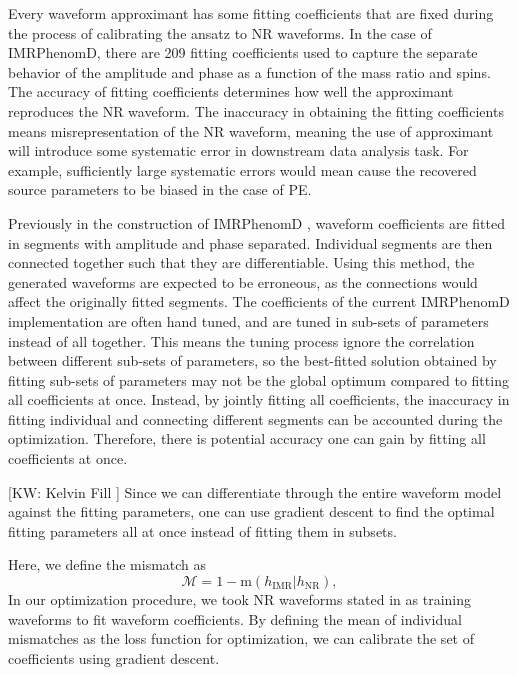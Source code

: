\documentclass[twocolumn]{aastex631}
\newcommand{\kw}[1]{{\color{rb4}[KW: #1 ]}}
\begin{document}
Every waveform approximant has some fitting coefficients that are fixed during
the process of calibrating the ansatz to NR waveforms. In the case of
IMRPhenomD, there are 209 fitting coefficients used to capture the separate
behavior of the amplitude and phase as a function of the mass ratio and spins.
The accuracy of fitting coefficients determines how well the approximant
reproduces the NR waveform. The inaccuracy in obtaining the fitting coefficients
means misrepresentation of the NR waveform, meaning the use of approximant will
introduce some systematic error in downstream data analysis task. For example, sufficiently large systematic errors 
would mean cause the recovered source parameters to be biased in the case of PE.

Previously in the construction of IMRPhenomD \citep{Khan:2015jqa}, waveform
coefficients are fitted in segments with amplitude and phase separated.
Individual segments are then connected together such that they are
differentiable. Using this method, the generated waveforms are expected to be
erroneous, as the connections would affect the originally fitted segments. The
coefficients of the current IMRPhenomD implementation are often hand tuned, and
are tuned in sub-sets of parameters instead of all together. This means the
tuning process ignore the correlation between different sub-sets of parameters,
so the best-fitted solution obtained by fitting sub-sets of parameters may not
be the global optimum compared to fitting all coefficients at once. Instead, by
jointly fitting all coefficients, the inaccuracy in fitting individual and
connecting different segments can be accounted during the optimization.
Therefore, there is potential accuracy one can gain by fitting all coefficients
at once.

\kw{Kelvin Fill}
Since we can differentiate through the entire waveform model against the fitting
parameters, one can use gradient descent to find the optimal fitting parameters
all at once instead of fitting them in subsets.

Here, we define the mismatch as
\begin{equation}
	\mathcal{M}=1-\mathrm{m}(h_{\mathrm{IMR}}|h_{\mathrm{NR}}), 
\end{equation} 
In our optimization procedure, we took NR waveforms stated in \citep{Khan:2015jqa} as training waveforms to fit waveform coefficients. 
By defining the mean of individual mismatches as the loss function for optimization, we can calibrate the set of coefficients using gradient descent. 
\end{document}
